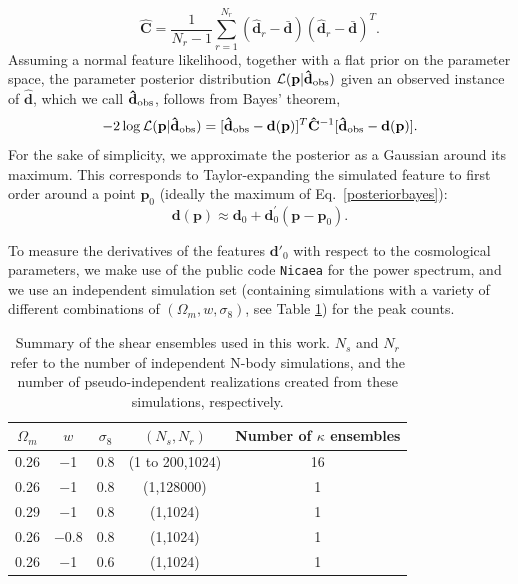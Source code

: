 \documentclass[reprint,aps,prd,superscriptaddress,showkeys,showpacs]{revtex4-1}
\newcommand{\bb}[1]{\mathbf{#1}}
\newcommand{\bbh}[1]{\mathbf{\hat{#1}}}
\begin{document}
\begin{equation}
\label{covest}
\bbh{C} = \frac{1}{N_r-1}\sum_{r=1}^{N_r} (\bbh{d}_r - \bar{\bb{d}}) (\bbh{d}_r - \bar{\bb{d}})^T.
\end{equation}
%
Assuming a normal feature likelihood, together with a flat prior on
the parameter space, the parameter posterior distribution
$\mathcal{L}(\bb{p}\vert\bbh{d}_{\rm obs})$ given an observed instance of
$\bbh{d}$, which we call $\bbh{d}_{\rm obs}$, follows from Bayes' theorem,
%
\begin{equation}
\label{posteriorbayes}
-2\log\mathcal{L}(\bb{p}\vert\bbh{d}_{\rm obs}) = [\bbh{d}_{\rm obs}-\bb{d}(\bb{p})]^T\bbh{C}^{-1}[\bbh{d}_{\rm obs}-\bb{d}(\bb{p})].
\end{equation}
%
For the sake of simplicity, we approximate the posterior as a Gaussian
around its maximum. This corresponds to Taylor-expanding the simulated
feature to first order around a point $\bb{p}_0$ (ideally the maximum
of Eq.~\ref{posteriorbayes}):
%
\begin{equation}
\bb{d}(\bb{p}) \approx \bb{d}_0 + \bb{d}_0^\prime(\bb{p}-\bb{p}_0).
\end{equation}
%

To measure the derivatives of the features $\bb{d}'_0$ with respect to
the cosmological parameters, we make use of the public code
\texttt{Nicaea} \citep{Nicaea} for the power spectrum, and we use an
independent simulation set (containing simulations with a variety of
different combinations of $(\Omega_m,w,\sigma_8)$, see Table
\ref{simtable}) for the peak counts.

\begin{table}
\begin{center}
\begin{tabular}{c|c|c||c|c}
\toprule
$\Omega_m$ &  $w$ & $\sigma_8$ & $(N_s,N_r)$ & Number of $\kappa$ ensembles \\ \hline \hline
\midrule
%
0.26 & $-$1 & 0.8 & (1 to 200,1024) & 16 \\
0.26 & $-$1 & 0.8 & (1,128000) & 1 \\
0.29 & $-$1 & 0.8 & (1,1024) & 1 \\
0.26 & $-$0.8 & 0.8 & (1,1024) & 1 \\
0.26 & $-$1 & 0.6 & (1,1024) & 1 \\
%
\bottomrule
\end{tabular}
\end{center}
\caption{Summary of the shear ensembles used in this work. $N_s$ and
  $N_r$ refer to the number of independent N-body simulations, and the
  number of pseudo-independent realizations created from these
  simulations, respectively.}
\label{simtable}
\end{table}
\end{document}
